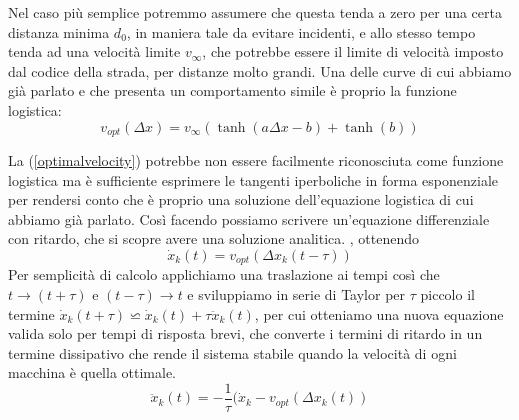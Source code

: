 \begin{multicols}{2}
	 Nel caso più semplice potremmo assumere che questa tenda a zero per una certa distanza minima $d_0$, in maniera tale da evitare incidenti, e allo stesso tempo tenda ad una velocità limite $v_\infty$, che potrebbe essere il limite di velocità imposto dal codice della strada, per distanze molto grandi. Una delle curve di cui abbiamo già parlato e che presenta un comportamento simile è proprio la funzione logistica:
	 \begin{equation}
	 	v_{opt}(\Delta x)= v_\infty(\tanh(a\Delta x-b)+\tanh(b))
	 	\label{optimalvelocity}
	 \end{equation}
	
	
\end{multicols}
La (\ref{optimalvelocity}) potrebbe non essere facilmente riconosciuta come funzione logistica ma è sufficiente esprimere le tangenti iperboliche in forma esponenziale per rendersi conto che è proprio una soluzione dell'equazione logistica di cui abbiamo già parlato. Così facendo possiamo scrivere un'equazione differenziale con ritardo, che si scopre avere una soluzione analitica. ,  ottenendo
\begin{equation}
	\dot{x}_k(t)=v_{opt}(\Delta x_k(t-\tau))
	\label{ovmdiffeq}
\end{equation} 
Per semplicità di calcolo applichiamo una traslazione ai tempi così che $t\rightarrow (t+\tau)$ e $(t-\tau)\rightarrow t$ e sviluppiamo in serie di Taylor per $\tau$ piccolo il termine $\dot{x}_k(t+\tau)\backsimeq \dot{x}_k(t)+\tau \ddot{x}_k(t)$, per cui otteniamo una nuova equazione valida solo per tempi di risposta brevi, che converte i termini di ritardo in un termine dissipativo che rende il sistema stabile quando la velocità di ogni macchina è quella ottimale.
\begin{equation}
	\ddot{x}_k(t)=-\frac{1}{\tau}(\dot{x}_k-v_{opt}(\Delta x_k(t))
	\label{eqddissipazione}
\end{equation}

